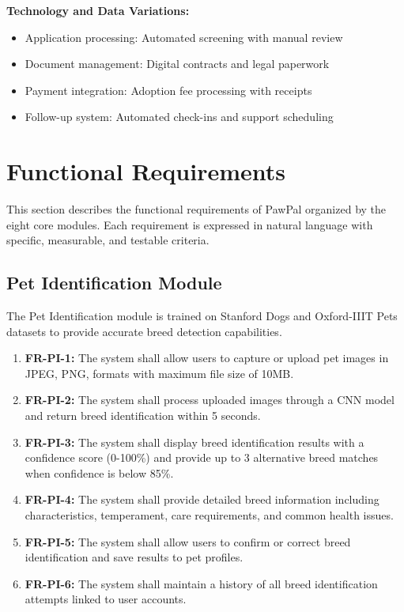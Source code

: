 \textbf{Technology and Data Variations:}
\begin{itemize}
    \item Application processing: Automated screening with manual review
    \item Document management: Digital contracts and legal paperwork
    \item Payment integration: Adoption fee processing with receipts
    \item Follow-up system: Automated check-ins and support scheduling
\end{itemize}

\section{Functional Requirements}
This section describes the functional requirements of PawPal organized by the eight core modules. Each requirement is expressed in natural language with specific, measurable, and testable criteria.

\subsection{Pet Identification Module}
The Pet Identification module is trained on Stanford Dogs and Oxford-IIIT Pets datasets to provide accurate breed detection capabilities.

\begin{enumerate}
    \item \textbf{FR-PI-1:} The system shall allow users to capture or upload pet images in JPEG, PNG, formats with maximum file size of 10MB.
    \item \textbf{FR-PI-2:} The system shall process uploaded images through a CNN model and return breed identification within 5 seconds.
    \item \textbf{FR-PI-3:} The system shall display breed identification results with a confidence score (0-100\%) and provide up to 3 alternative breed matches when confidence is below 85\%.
    \item \textbf{FR-PI-4:} The system shall provide detailed breed information including characteristics, temperament, care requirements, and common health issues.
    \item \textbf{FR-PI-5:} The system shall allow users to confirm or correct breed identification and save results to pet profiles.
    \item \textbf{FR-PI-6:} The system shall maintain a history of all breed identification attempts linked to user accounts.
\end{enumerate}

